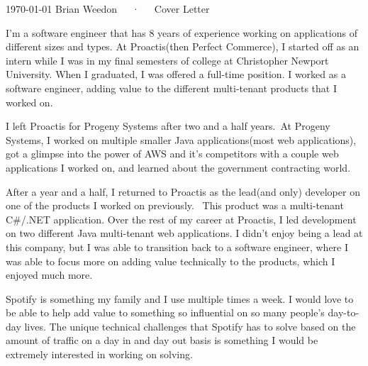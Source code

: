 \documentclass[11pt, a4paper]{awesome-cv}
\begin{document}
\makecvheader[C]

\makecvfooter
{\today}
{Brian Weedon~~~·~~~Cover Letter}
{}

\makelettertitle

\begin{cvletter}

    I'm a software engineer that has 8 years of experience working on applications of different sizes and types. At Proactis(then Perfect Commerce), I started off as an intern while I was in my final semesters of college at Christopher Newport University. When I graduated, I was offered a full-time position. I worked as a software engineer, adding value to the different multi-tenant products that I worked on. 

    I left Proactis for Progeny Systems after two and a half years. At Progeny Systems, I worked on multiple smaller Java applications(most web applications), got a glimpse into the power of AWS and it's competitors with a couple web applications I worked on, and learned about the government contracting world. 

    After a year and a half, I returned to Proactis as the lead(and only) developer on one of the products I worked on previously.  This product was a multi-tenant C\#/.NET application. Over the rest of my career at Proactis, I led development on two different Java multi-tenant web applications. I didn't enjoy being a lead at this company, but I was able to transition back to a software engineer, where I was able to focus more on adding value technically to the products, which I enjoyed much more.

    Spotify is something my family and I use multiple times a week. I would love to be able to help add value to something so influential on so many people's day-to-day lives. The unique technical challenges that Spotify has to solve based on the amount of traffic on a day in and day out basis is something I would be extremely interested in working on solving.


\end{cvletter}
\end{document}
